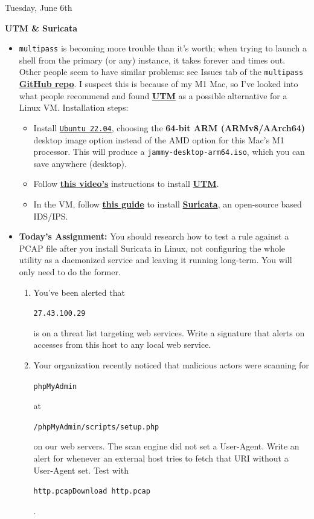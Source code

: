 \documentclass[11pt]{article}
\newcommand\codebox[1]{
    \noindent\hspace{-0.25em}\begin{tcolorbox}[on line, hbox, colback = codeblack, colframe = codeborder, coltext = white, boxrule = 1.5pt, left = 2pt, right = 2pt, top = 0.5pt, bottom = 0.5pt]
    \small\texttt{#1}\normalsize
    \end{tcolorbox}\hspace{-0.25em}
}
\begin{document}
\begin{orangebox}{Tuesday, June 6th\vspace{-2.2em}\begin{flushright}\large\textbf{UTM \& Suricata} \end{flushright}}
    \begin{itemize}
        \item \texttt{multipass} is becoming more trouble than it's worth; when trying to launch a shell from the primary (or any) instance, it takes forever and times out. Other people seem to have similar problems: see Issues tab of the \texttt{multipass} \href{https://github.com/canonical/multipass/issues}{\textbf{GitHub repo}}. I suspect this is because of my M1 Mac, so I've looked into what people recommend and found \href{https://mac.getutm.app/}{\textbf{UTM}} as a possible alternative for a Linux VM. Installation steps:
        \begin{itemize}
            \item Install \href{https://cdimage.ubuntu.com/jammy/daily-live/current/}{\texttt{Ubuntu 22.04}}, choosing the \textbf{64-bit ARM (ARMv8/AArch64)} desktop image option instead of the AMD option for this Mac's M1 processor. This will produce a \texttt{jammy-desktop-arm64.iso}, which you can save anywhere (desktop).
            \item Follow \href{https://www.youtube.com/watch?v=1WWj6qoWhJw}{\textbf{this video's}} instructions to install \href{https://mac.getutm.app/}{\textbf{UTM}}.
            \item In the VM, follow \href{https://www.digitalocean.com/community/tutorials/how-to-install-suricata-on-ubuntu-20-04}{\textbf{this guide}} to install \href{https://en.wikipedia.org/wiki/Suricata_(software)}{\textbf{Suricata}}, an open-source based IDS/IPS.
        \end{itemize}
        \item \textbf{Today's Assignment:} You should research how to test a rule against a PCAP file after you install Suricata in Linux, not configuring the whole utility as a daemonized service and leaving it running long-term. You will only need to do the former.
        \begin{enumerate}
            \item You've been alerted that \codebox{27.43.100.29} is on a threat list targeting web services. Write a signature that alerts on accesses from this host to any local web service.
            \item Your organization recently noticed that malicious actors were scanning for \codebox{phpMyAdmin} at \codebox{/phpMyAdmin/scripts/setup.php} on our web servers. The scan engine did not set a User-Agent. Write an alert for whenever an external host tries to fetch that URI without a User-Agent set. Test with \codebox{http.pcapDownload http.pcap}.

\end{enumerate}
\end{itemize}
\end{orangebox}
\end{document}
